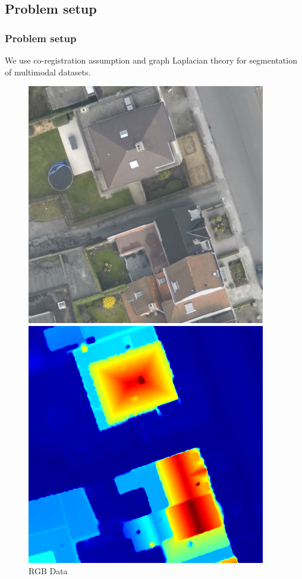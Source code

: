 \documentclass{beamer}
\begin{document}
\subsection{Problem setup}
\begin{frame}
  \frametitle{Problem setup}
  We use co-registration assumption and graph Laplacian theory for segmentation of multimodal datasets. \cite{Iyer2017}
  \begin{figure}
    \hfill
    \begin{minipage}[b]{0.40\linewidth}
      \centering
      \includegraphics[width=\textwidth]{./Images/DFC2015/optical.png}
      \caption{RGB Data}
    \end{minipage}
    \hfill
    \begin{minipage}[b]{0.40\linewidth}
      \centering
      \includegraphics[width=\textwidth]{./Images/DFC2015/lidarColor.png}

\end{minipage}
\end{figure}
\end{frame}
\end{document}
